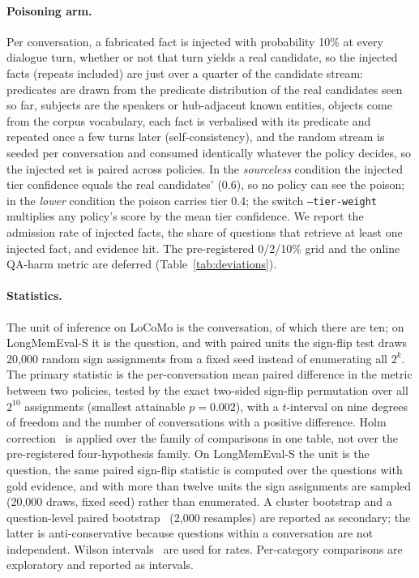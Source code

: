 \documentclass{ceurart}
\newcommand{\code}[1]{\texttt{#1}}
\begin{document}
\paragraph{Poisoning arm.} Per conversation, a fabricated fact is injected with probability 10\% at every dialogue turn, whether or not that turn yields a real candidate, so the \poisN{} injected facts (repeats included) are just over a quarter of the candidate stream: predicates are drawn from the predicate distribution of the real candidates seen so far, subjects are the speakers or hub-adjacent known entities, objects come from the corpus vocabulary, each fact is verbalised with its predicate and repeated once a few turns later (self-consistency), and the random stream is seeded per conversation and consumed identically whatever the policy decides, so the injected set is paired across policies. In the \emph{sourceless} condition the injected tier confidence equals the real candidates' (0.6), so no policy can see the poison; in the \emph{lower} condition the poison carries tier 0.4; the switch \code{--tier-weight} multiplies any policy's score by the mean tier confidence. We report the admission rate of injected facts, the share of questions that retrieve at least one injected fact, and evidence hit. The pre-registered 0/2/10\% grid and the online QA-harm metric are deferred (Table~\ref{tab:deviations}).

\paragraph{Statistics.} The unit of inference on LoCoMo is the conversation, of which there are ten; on LongMemEval-S it is the question, and with \lmeKHitFitRandom{} paired units the sign-flip test draws 20,000 random sign assignments from a fixed seed instead of enumerating all $2^k$. The primary statistic is the per-conversation mean paired difference in the metric between two policies, tested by the exact two-sided sign-flip permutation over all $2^{10}$ assignments (smallest attainable $p=0.002$), with a $t$-interval on nine degrees of freedom and the number of conversations with a positive difference. Holm correction~\cite{holm1979} is applied over the family of comparisons in one table, not over the pre-registered four-hypothesis family. On LongMemEval-S the unit is the question, the same paired sign-flip statistic is computed over the questions with gold evidence, and with more than twelve units the sign assignments are sampled (20,000 draws, fixed seed) rather than enumerated. A cluster bootstrap and a question-level paired bootstrap~\cite{efron1993bootstrap} (2,000 resamples) are reported as secondary; the latter is anti-conservative because questions within a conversation are not independent. Wilson intervals~\cite{wilson1927} are used for rates. Per-category comparisons are exploratory and reported as intervals.
\end{document}
